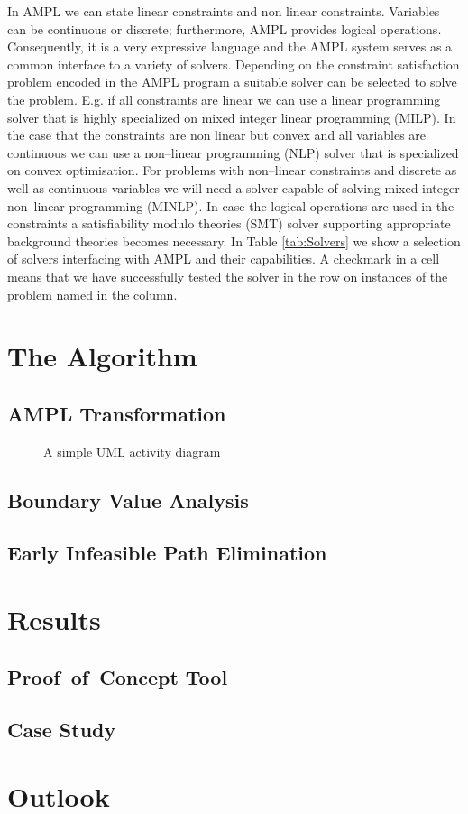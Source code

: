 \documentclass[runningheads,a4paper]{llncs}%
\begin{document}
In AMPL we can state linear constraints and non linear constraints. Variables can be continuous or discrete; furthermore, AMPL provides logical operations. Consequently, it is a very expressive language and the AMPL system serves as a common interface to a variety of solvers. Depending on the constraint satisfaction problem encoded in the AMPL program a suitable solver can be selected to solve the problem. E.g. if all constraints are linear we can use a linear programming solver that is highly specialized on mixed integer linear programming (MILP). In the case that the constraints are non linear but convex and all variables are continuous we can use a non--linear programming (NLP) solver that is specialized on convex optimisation. For problems with non--linear constraints and discrete as well as continuous variables we will need a solver capable of solving mixed integer non--linear programming (MINLP). In case the logical operations are used in the constraints a satisfiability modulo theories (SMT) solver supporting appropriate background theories becomes necessary. In Table \ref{tab:Solvers} we show a selection of solvers interfacing with AMPL and their capabilities. A checkmark in a cell means that we have successfully tested the solver in the row on instances of the problem named in the column.%
\section{The Algorithm}%
\subsection{AMPL Transformation}%
\label{sec:AMPLTransformation}%
\begin{figure}%
\def\svgwidth{\textwidth}%
\graphicspath{{./pics/}}%
%
\caption{A simple UML activity diagram}%
\label{fig:AssignmentDecision}%
\end{figure}%
\subsection{Boundary Value Analysis}%
\subsection{Early Infeasible Path Elimination}%
\section{Results}%
\subsection{Proof--of--Concept Tool}%
\subsection{Case Study}%
\section{Outlook}%
%
%
\end{document}

